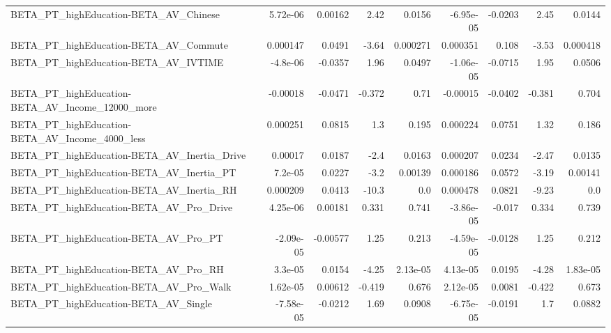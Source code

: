 \begin{tabular}{lrrrrrrrr}
BETA\_PT\_highEducation-BETA\_AV\_Chinese              &    5.72e-06 &      0.00162 &     2.42 &   0.0156 &  -6.95e-05 &     -0.0203 &         2.45 &        0.0144 \\
BETA\_PT\_highEducation-BETA\_AV\_Commute              &    0.000147 &       0.0491 &    -3.64 & 0.000271 &   0.000351 &       0.108 &        -3.53 &      0.000418 \\
BETA\_PT\_highEducation-BETA\_AV\_IVTIME               &    -4.8e-06 &      -0.0357 &     1.96 &   0.0497 &  -1.06e-05 &     -0.0715 &         1.95 &        0.0506 \\
BETA\_PT\_highEducation-BETA\_AV\_Income\_12000\_more    &    -0.00018 &      -0.0471 &   -0.372 &     0.71 &   -0.00015 &     -0.0402 &       -0.381 &         0.704 \\
BETA\_PT\_highEducation-BETA\_AV\_Income\_4000\_less     &    0.000251 &       0.0815 &      1.3 &    0.195 &   0.000224 &      0.0751 &         1.32 &         0.186 \\
BETA\_PT\_highEducation-BETA\_AV\_Inertia\_Drive        &     0.00017 &       0.0187 &     -2.4 &   0.0163 &   0.000207 &      0.0234 &        -2.47 &        0.0135 \\
BETA\_PT\_highEducation-BETA\_AV\_Inertia\_PT           &     7.2e-05 &       0.0227 &     -3.2 &  0.00139 &   0.000186 &      0.0572 &        -3.19 &       0.00141 \\
BETA\_PT\_highEducation-BETA\_AV\_Inertia\_RH           &    0.000209 &       0.0413 &    -10.3 &      0.0 &   0.000478 &      0.0821 &        -9.23 &           0.0 \\
BETA\_PT\_highEducation-BETA\_AV\_Pro\_Drive            &    4.25e-06 &      0.00181 &    0.331 &    0.741 &  -3.86e-05 &      -0.017 &        0.334 &         0.739 \\
BETA\_PT\_highEducation-BETA\_AV\_Pro\_PT               &   -2.09e-05 &     -0.00577 &     1.25 &    0.213 &  -4.59e-05 &     -0.0128 &         1.25 &         0.212 \\
BETA\_PT\_highEducation-BETA\_AV\_Pro\_RH               &     3.3e-05 &       0.0154 &    -4.25 & 2.13e-05 &   4.13e-05 &      0.0195 &        -4.28 &      1.83e-05 \\
BETA\_PT\_highEducation-BETA\_AV\_Pro\_Walk             &    1.62e-05 &      0.00612 &   -0.419 &    0.676 &   2.12e-05 &      0.0081 &       -0.422 &         0.673 \\
BETA\_PT\_highEducation-BETA\_AV\_Single               &   -7.58e-05 &      -0.0212 &     1.69 &   0.0908 &  -6.75e-05 &     -0.0191 &          1.7 &        0.0882 \\

\end{tabular}
